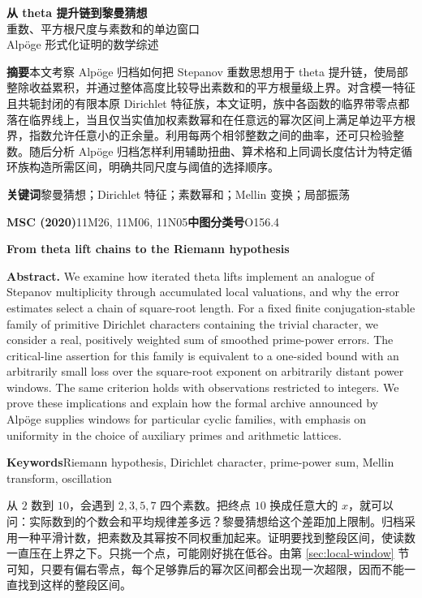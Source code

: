 \documentclass[UTF8,fontset=none,a4paper,11pt]{ctexart}
\theoremstyle{definition}
\begin{document}
\begin{center}
{\LARGE\bfseries 从 theta 提升链到黎曼猜想}\\[4pt]
{\large 重数、平方根尺度与素数和的单边窗口}\\[3pt]
{\small Alpöge 形式化证明的数学综述}
\end{center}
\noindent\textbf{摘要}\quad 本文考察 Alpöge 归档如何把 Stepanov 重数思想用于 theta 提升链，使局部整除收益累积，并通过整体高度比较导出素数和的平方根量级上界。对含模一特征且共轭封闭的有限本原 Dirichlet 特征族，本文证明，族中各函数的临界带零点都落在临界线上，当且仅当实值加权素数幂和在任意远的幂次区间上满足单边平方根界，指数允许任意小的正余量。利用每两个相邻整数之间的曲率，还可只检验整数。随后分析 Alpöge 归档怎样利用辅助扭曲、算术格和上同调长度估计为特定循环族构造所需区间，明确共同尺度与阈值的选择顺序。

\noindent\textbf{关键词}\quad 黎曼猜想；Dirichlet 特征；素数幂和；Mellin 变换；局部振荡

\noindent\textbf{MSC (2020)}\quad 11M26, 11M06, 11N05\qquad \textbf{中图分类号}\quad O156.4

\begin{samepage}
\begin{center}\large\bfseries From theta lift chains to the Riemann hypothesis\end{center}
\noindent\textbf{Abstract.} We examine how iterated theta lifts implement an analogue of Stepanov multiplicity through accumulated local valuations, and why the error estimates select a chain of square-root length. For a fixed finite conjugation-stable family of primitive Dirichlet characters containing the trivial character, we consider a real, positively weighted sum of smoothed prime-power errors. The critical-line assertion for this family is equivalent to a one-sided bound with an arbitrarily small loss over the square-root exponent on arbitrarily distant power windows. The same criterion holds with observations restricted to integers. We prove these implications and explain how the formal archive announced by Alpöge supplies windows for particular cyclic families, with emphasis on uniformity in the choice of auxiliary primes and arithmetic lattices.

\noindent\textbf{Keywords}\quad Riemann hypothesis, Dirichlet character, prime-power sum, Mellin transform, oscillation
\end{samepage}

从 $2$ 数到 $10$，会遇到 $2,3,5,7$ 四个素数。把终点 $10$ 换成任意大的 $x$，就可以问：实际数到的个数会和平均规律差多远？黎曼猜想给这个差距加上限制。归档采用一种平滑计数，把素数及其幂按不同权重加起来。证明要找到整段区间，使读数一直压在上界之下。只挑一个点，可能刚好挑在低谷。由第 \ref{sec:local-window} 节可知，只要有偏右零点，每个足够靠后的幂次区间都会出现一次超限，因而不能一直找到这样的整段区间。
\end{document}
